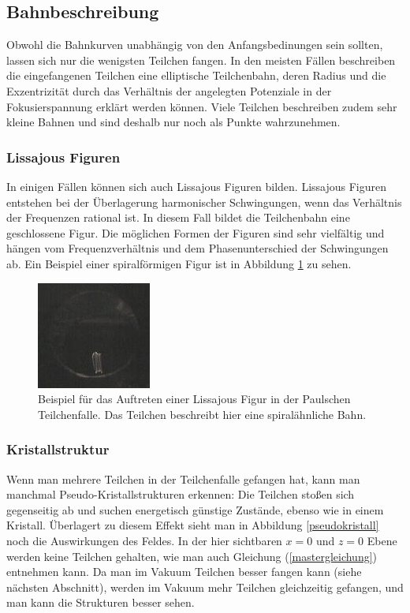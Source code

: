 \documentclass[a4paper,12pt]{article}
\begin{document}
\subsection{Bahnbeschreibung}
Obwohl die Bahnkurven unabhängig von den Anfangsbedinungen sein sollten, lassen sich nur die wenigsten Teilchen fangen.
In den meisten Fällen beschreiben die eingefangenen Teilchen eine elliptische Teilchenbahn, deren Radius und die Exzentrizität durch das Verhältnis der angelegten Potenziale 
in der Fokusierspannung erklärt werden können.
Viele Teilchen beschreiben zudem sehr kleine Bahnen und sind deshalb nur noch als Punkte wahrzunehmen.

\subsubsection*{Lissajous Figuren}
In einigen Fällen können sich auch Lissajous Figuren bilden. Lissajous Figuren entstehen bei der Überlagerung harmonischer Schwingungen, wenn das Verhältnis der Frequenzen rational ist.
In diesem Fall bildet die Teilchenbahn eine geschlossene Figur.
Die möglichen Formen der Figuren sind sehr vielfältig und hängen vom Frequenzverhältnis und dem Phasenunterschied der Schwingungen ab.
Ein Beispiel einer spiralförmigen Figur ist in Abbildung \ref{Lissjous} zu sehen.

\begin{figure}[htb]
		\centering
		\includegraphics{lisa_klein.jpg}
		\caption{Beispiel für das Auftreten einer Lissajous Figur in der Paulschen Teilchenfalle.
		Das Teilchen beschreibt hier eine spiralähnliche Bahn.}
		\label{Lissjous}
\end{figure}

\subsubsection*{Kristallstruktur}
Wenn man mehrere Teilchen in der Teilchenfalle gefangen hat, kann man manchmal Pseudo-Kristallstrukturen erkennen:
Die Teilchen stoßen sich gegenseitig ab und suchen energetisch günstige Zustände, ebenso wie in einem Kristall.
Überlagert zu diesem Effekt sieht man in Abbildung \ref{pseudokristall} noch die Auswirkungen des Feldes.
In der hier sichtbaren $x = 0$ und $z = 0$  Ebene werden keine Teilchen gehalten, wie man auch Gleichung (\ref{mastergleichung}) entnehmen kann.
Da man im Vakuum Teilchen besser fangen kann (siehe nächsten Abschnitt), werden im Vakuum mehr Teilchen gleichzeitig gefangen, und man kann die Strukturen besser sehen.
\end{document}
